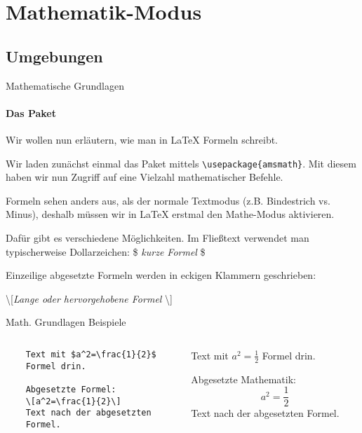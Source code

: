 \section{Mathematik-Modus}
\subsection{Umgebungen}
\begin{frame}[fragile]{Mathematische Grundlagen}
\framesubtitle{Das Paket }
Wir wollen nun erläutern, wie man in \LaTeX{} Formeln schreibt. 

\medskip\pause
Wir laden zunächst einmal das Paket  mittels \verb+\usepackage{amsmath}+. Mit diesem haben wir nun Zugriff auf eine Vielzahl mathematischer Befehle. 

\medskip\pause
Formeln sehen anders aus, als der normale Textmodus (z.B. Bindestrich vs. Minus), deshalb müssen wir in \LaTeX{} erstmal den Mathe-Modus aktivieren. 

\medskip\pause
Dafür gibt es verschiedene Möglichkeiten. Im Fließtext verwendet man typischerweise Dollarzeichen: \$ \emph{kurze Formel} \$

Einzeilige abgesetzte Formeln werden in eckigen Klammern geschrieben: 
\begin{center}
\textbackslash[\emph{Lange oder hervorgehobene Formel} \textbackslash]
\end{center}
\end{frame}

\begin{frame}[fragile]{Math. Grundlagen Beispiele}
\begin{columns}
\begin{column}{.48\textwidth}\footnotesize
\begin{codeblock}
\begin{verbatim}
	Text mit $a^2=\frac{1}{2}$
	Formel drin.

	Abgesetzte Formel:
	\[a^2=\frac{1}{2}\]
	Text nach der abgesetzten
	Formel.
\end{verbatim}
\end{codeblock}
\end{column}
%
\begin{column}{.45\textwidth}		
	Text mit $a^2=\frac{1}{2}$ Formel drin.

	Abgesetzte Mathematik:
	\[a^2=\frac{1}{2}\]
	Text nach der abgesetzten Formel.
\end{column}

\end{columns}
\end{frame}

